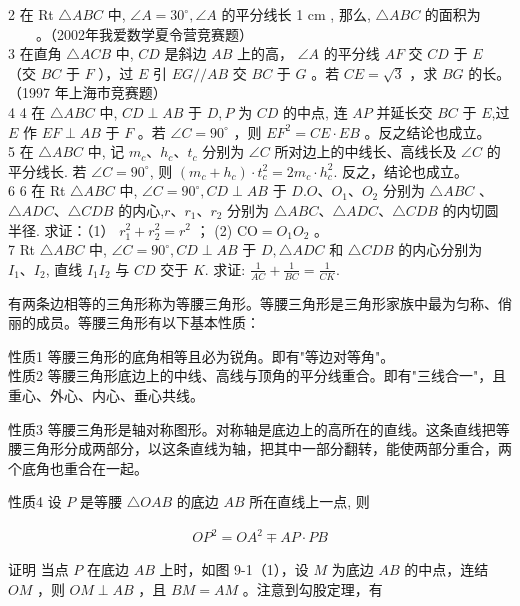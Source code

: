 \documentclass[10pt]{article}
\begin{document}
2 在 Rt $\triangle A B C$ 中, $\angle A=30^{\circ}, \angle A$ 的平分线长 1 cm , 那么, $\triangle A B C$ 的面积为 $\qquad$。（2002年我爱数学夏令营竞赛题）\\
3 在直角 $\triangle A C B$ 中, $C D$ 是斜边 $A B$ 上的高， $\angle A$ 的平分线 $A F$ 交 $C D$ 于 $E$ （交 $B C$ 于 $F$ ），过 $E$ 引 $E G / / A B$ 交 $B C$ 于 $G$ 。若 $C E=\sqrt{3}$ ，求 $B G$ 的长。 （1997 年上海市竞赛题）\\
4 4 在 $\triangle A B C$ 中, $C D \perp A B$ 于 $D, P$ 为 $C D$ 的中点, 连 $A P$ 并延长交 $B C$ 于 $E$,过 $E$ 作 $E F \perp A B$ 于 $F$ 。若 $\angle C=90^{\circ}$ ，则 $E F^{2}=C E \cdot E B$ 。反之结论也成立。\\
5 在 $\triangle A B C$ 中, 记 $m_{c} 、 h_{c} 、 t_{c}$ 分别为 $\angle C$ 所对边上的中线长、高线长及 $\angle C$ 的平分线长. 若 $\angle C=90^{\circ}$, 则 $\left(m_{c}+h_{c}\right) \cdot t_{c}^{2}=2 m_{c} \cdot h_{c}^{2}$. 反之，结论也成立。\\
6 6 在 Rt $\triangle A B C$ 中, $\angle C=90^{\circ}, C D \perp A B$ 于 $D . O 、 O_{1} 、 O_{2}$ 分别为 $\triangle A B C$ 、 $\triangle A D C 、 \triangle C D B$ 的内心,$r 、 r_{1} 、 r_{2}$ 分别为 $\triangle A B C 、 \triangle A D C 、 \triangle C D B$ 的内切圆半径. 求证：（1） $r_{1}^{2}+r_{2}^{2}=r^{2}$ ； (2) $\mathrm{CO}=O_{1} O_{2}$ 。\\
7 Rt $\triangle A B C$ 中, $\angle C=90^{\circ}, C D \perp A B$ 于 $D, \triangle A D C$ 和 $\triangle C D B$ 的内心分别为 $I_{1} 、 I_{2}$, 直线 $I_{1} I_{2}$ 与 $C D$ 交于 $K$. 求证: $\frac{1}{A C}+\frac{1}{B C}=\frac{1}{C K}$.

有两条边相等的三角形称为等腰三角形。等腰三角形是三角形家族中最为匀称、俏丽的成员。等腰三角形有以下基本性质：

性质1 等腰三角形的底角相等且必为锐角。即有"等边对等角"。\\
性质2 等腰三角形底边上的中线、高线与顶角的平分线重合。即有"三线合一"，且重心、外心、内心、垂心共线。

性质3 等腰三角形是轴对称图形。对称轴是底边上的高所在的直线。这条直线把等腰三角形分成两部分，以这条直线为轴，把其中一部分翻转，能使两部分重合，两个底角也重合在一起。

性质4 设 $P$ 是等腰 $\triangle O A B$ 的底边 $A B$ 所在直线上一点, 则

\begin{align*}
O P^{2}=O A^{2} \mp A P \cdot P B
\end{align*}

证明 当点 $P$ 在底边 $A B$ 上时，如图 9-1（1），设 $M$ 为底边 $A B$ 的中点，连结 $O M$ ，则 $O M \perp A B$ ，且 $B M=A M$ 。注意到勾股定理，有
\end{document}
